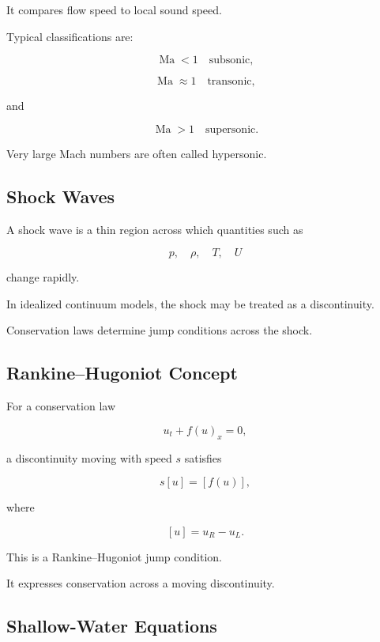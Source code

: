It compares flow speed to local sound speed.

Typical classifications are:

\[
\boxed{
\operatorname{Ma}<1
\quad
\text{subsonic},
}
\]

\[
\boxed{
\operatorname{Ma}\approx1
\quad
\text{transonic},
}
\]

and

\[
\boxed{
\operatorname{Ma}>1
\quad
\text{supersonic}.
}
\]

Very large Mach numbers are often called hypersonic.

\subsection{Shock Waves}
\label{subsec:shock-waves}

A shock wave is a thin region across which quantities such as

\[
\boxed{
p,
\quad
\rho,
\quad
T,
\quad
U
}
\]

change rapidly.

In idealized continuum models, the shock may be treated as a discontinuity.

Conservation laws determine jump conditions across the shock.

\subsection{Rankine--Hugoniot Concept}
\label{subsec:rankine-hugoniot-concept}

For a conservation law

\[
\boxed{
u_t+f(u)_x=0,
}
\]

a discontinuity moving with speed \(s\) satisfies

\[
\boxed{
s[u]
=
[f(u)],
}
\]

where

\[
[u]
=
u_R-u_L.
\]

This is a Rankine--Hugoniot jump condition.

It expresses conservation across a moving discontinuity.

\subsection{Shallow-Water Equations}
\label{subsec:shallow-water-equations}

